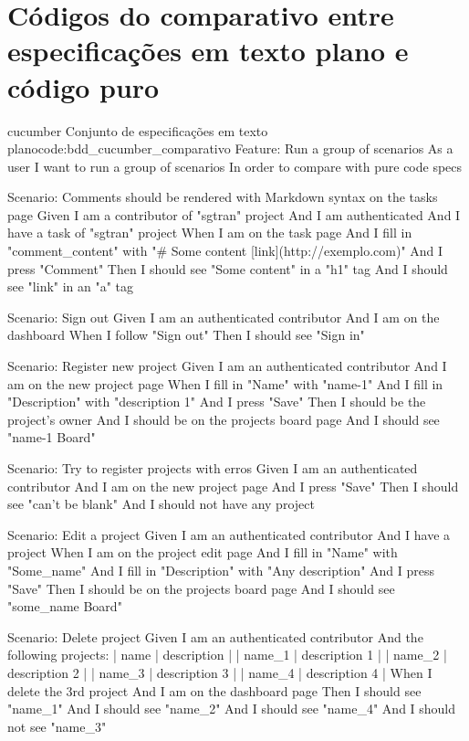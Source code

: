 \chapter{Códigos do comparativo entre especificações em texto plano e código puro}
\label{cha:codigo_do_comparativo}

\begin{mycode}{cucumber}%
{Conjunto de especificações em texto plano}{code:bdd_cucumber_comparativo}
Feature: Run a group of scenarios
  As a user
  I want to run a group of scenarios
  In order to compare with pure code specs

  Scenario: Comments should be rendered with Markdown syntax on the tasks page
    Given I am a contributor of "sgtran" project
    And I am authenticated
    And I have a task of "sgtran" project
    When I am on the task page
    And I fill in "comment_content" with "# Some content [link](http://exemplo.com)"
    And I press "Comment"
    Then I should see "Some content" in a "h1" tag
    And I should see "link" in an "a" tag

  Scenario: Sign out
    Given I am an authenticated contributor
    And I am on the dashboard
    When I follow "Sign out"
    Then I should see "Sign in"

  Scenario: Register new project
    Given I am an authenticated contributor
    And I am on the new project page
    When I fill in "Name" with "name-1"
    And I fill in "Description" with "description 1"
    And I press "Save"
    Then I should be the project's owner
    And I should be on the projects board page
    And I should see "name-1 Board"

  Scenario: Try to register projects with erros
    Given I am an authenticated contributor
    And I am on the new project page
    And I press "Save"
    Then I should see "can't be blank"
    And I should not have any project

  Scenario: Edit a project
    Given I am an authenticated contributor
    And I have a project
    When I am on the project edit page
    And I fill in "Name" with "Some_name"
    And I fill in "Description" with "Any description"
    And I press "Save"
    Then I should be on the projects board page
    And I should see "some_name Board"

  Scenario: Delete project
    Given I am an authenticated contributor
    And the following projects:
      | name   | description   |
      | name_1 | description 1 |
      | name_2 | description 2 |
      | name_3 | description 3 |
      | name_4 | description 4 |
    When I delete the 3rd project
    And I am on the dashboard page
    Then I should see "name_1"
    And I should see "name_2"
    And I should see "name_4"
    And I should not see "name_3"


\end{mycode}
